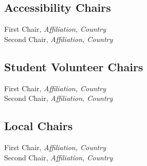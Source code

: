\subsection{Accessibility Chairs}
First Chair, \emph{Affiliation, Country}\\
Second Chair, \emph{Affiliation, Country}

\subsection{Student Volunteer Chairs}
First Chair, \emph{Affiliation, Country}\\
Second Chair, \emph{Affiliation, Country}

\subsection{Local Chairs}
First Chair, \emph{Affiliation, Country}\\
Second Chair, \emph{Affiliation, Country}


